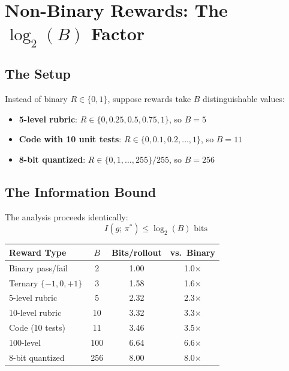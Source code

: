 \documentclass[11pt,a4paper]{article}
\theoremstyle{definition}
\theoremstyle{remark}
\begin{document}
\section{Non-Binary Rewards: The $\log_2(B)$ Factor}

\subsection{The Setup}

Instead of binary $R \in \{0, 1\}$, suppose rewards take $B$ distinguishable values:
\begin{itemize}
    \item \textbf{5-level rubric}: $R \in \{0, 0.25, 0.5, 0.75, 1\}$, so $B = 5$
    \item \textbf{Code with 10 unit tests}: $R \in \{0, 0.1, 0.2, \ldots, 1\}$, so $B = 11$
    \item \textbf{8-bit quantized}: $R \in \{0, 1, \ldots, 255\}/255$, so $B = 256$
\end{itemize}

\subsection{The Information Bound}

The analysis proceeds identically:
\[
I(g;\, \pi^*) \leq \log_2(B) \text{ bits}
\]

\begin{center}
\begin{tabular}{@{}lccc@{}}
\toprule
\textbf{Reward Type} & $B$ & \textbf{Bits/rollout} & \textbf{vs.\ Binary} \\
\midrule
Binary pass/fail & 2 & 1.00 & 1.0$\times$ \\
Ternary $\{-1, 0, +1\}$ & 3 & 1.58 & 1.6$\times$ \\
5-level rubric & 5 & 2.32 & 2.3$\times$ \\
10-level rubric & 10 & 3.32 & 3.3$\times$ \\
Code (10 tests) & 11 & 3.46 & 3.5$\times$ \\
100-level & 100 & 6.64 & 6.6$\times$ \\
8-bit quantized & 256 & 8.00 & 8.0$\times$ \\
\bottomrule
\end{tabular}
\end{center}
\end{document}

